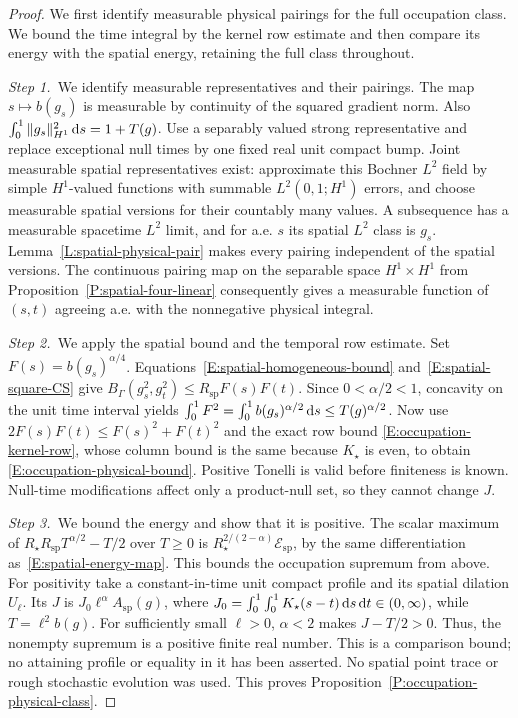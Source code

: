 \begin{proof}
  We first identify measurable physical pairings for the full occupation
  class. We bound the time integral by the kernel row estimate and then
  compare its energy with the spatial energy, retaining the full class
  throughout.


  \medskip
  \noindent\textit{Step 1.~}We identify measurable representatives and their
  pairings.
  The map $s\mapsto b(g_s)$ is measurable by continuity of the squared gradient
  norm. Also $\int_0^1\|g_s\|_{H^1}^2\,\mathrm{d} s = 1+T(g)$. Use a separably valued
  strong representative and replace exceptional null times by one fixed real
  unit compact bump. Joint measurable spatial representatives exist: approximate
  this Bochner $L^2$ field by simple $H^1$-valued functions with summable
  $L^2(0,1;H^1)$ errors, and choose measurable spatial versions for their
  countably many values. A subsequence has a measurable spacetime $L^2$ limit,
  and for a.e. $s$ its spatial $L^2$ class is $g_s$.
  Lemma~\ref{L:spatial-physical-pair} makes every pairing independent of the
  spatial versions. The continuous pairing map on the separable space $H^1\times
  H^1$ from Proposition~\ref{P:spatial-four-linear} consequently gives a
  measurable function of $(s,t)$ agreeing a.e. with the nonnegative physical
  integral.


  \medskip
  \noindent\textit{Step 2.~}We apply the spatial bound and the temporal row
  estimate.
  Set $F(s) = b(g_s)^{\alpha/4}$. Equations~\eqref{E:spatial-homogeneous-bound}
  and~\eqref{E:spatial-square-CS} give $B_\Gamma(g_s^2,g_t^2) \le
  R_{\mathrm{sp}}F(s)F(t)$. Since $0 < \alpha/2 < 1$, concavity on the unit time
  interval yields $\int_0^1F^2 = \int_0^1b(g_s)^{\alpha/2}\,\mathrm{d} s \le
  T(g)^{\alpha/2}$. Now use $2F(s)F(t) \le F(s)^2+F(t)^2$ and the exact row
  bound \eqref{E:occupation-kernel-row}, whose column bound is the same because
  $K_\star$ is even, to obtain \eqref{E:occupation-physical-bound}. Positive
  Tonelli is valid before finiteness is known. Null-time modifications affect
  only a product-null set, so they cannot change $J$.


  \medskip
  \noindent\textit{Step 3.~}We bound the energy and show that it is positive.
  The scalar maximum of $R_\star R_{\mathrm{sp}}T^{\alpha/2}-T/2$ over $T \ge 0$
  is $R_\star^{2/(2-\alpha)}\mathcal{E}_{\mathrm{sp}}$, by the same
  differentiation as~\eqref{E:spatial-energy-map}. This bounds the occupation
  supremum from above. For positivity take a constant-in-time unit compact
  profile and its spatial dilation $U_\ell$. Its $J$ is $J_0\ell^\alpha
  A_{\mathrm{sp}}(g)$, where $J_0 = \int_0^1\int_0^1K_\star(s-t)\,\mathrm{d} s\,\mathrm{d} t \in
  (0,\infty)$, while $T = \ell^2b(g)$. For sufficiently small $\ell > 0$,
  $\alpha < 2$ makes $J-T/2 > 0$. Thus, the nonempty supremum is a positive
  finite real number. This is a comparison bound; no attaining profile or
  equality in it has been asserted. No spatial point trace or rough stochastic
  evolution was used. This proves Proposition~\ref{P:occupation-physical-class}.
\end{proof}

